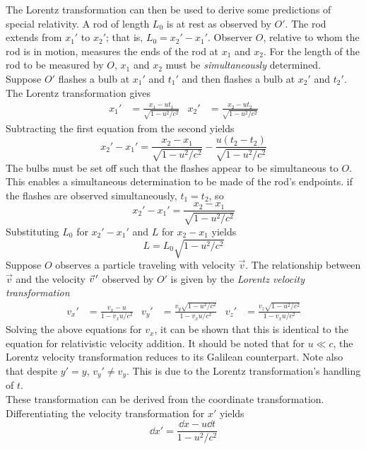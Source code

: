 \documentclass{subfiles}
\begin{document}
		The Lorentz transformation can then be used to derive some predictions of special relativity.
			A rod of length \(L_0\) is at rest as observed by \(O'\). The rod extends from \(x_1'\) to \(x_2'\); that is, \(L_0 = x_2' - x_1'\). Observer \(O\), relative to whom the rod is in motion, measures the ends of the rod at \(x_1\) and \(x_2\). For the length of the rod to be measured by \(O\), \(x_1\) and \(x_2\) must be \textit{simultaneously} determined. \\
			Suppose \(O'\) flashes a bulb at \(x_1'\) and \(t_1'\) and then flashes a bulb at \(x_2'\) and \(t_2'\). The Lorentz transformation gives
				\begin{align*}
					x_1' &= \frac{x_1 - ut_1}{\sqrt{1 - u^2/c^2}} &
						x_2' &= \frac{x_2 - ut_2}{\sqrt{1 - u^2/c^2}}	
				\end{align*}
				Subtracting the first equation from the second yields
				\[x_2' - x_1' = \frac{x_2 - x_1}{\sqrt{1 - u^2/c^2}} - \frac{u(t_2 - t_2)}{\sqrt{1 - u^2/c^2}}\]
				The bulbs must be set off such that the flashes appear to be simultaneous to \(O\). This enables a simultaneous determination to be made of the rod's endpoints. if the flashes are observed simultaneously, \(t_1 = t_2\), so
				\[x_2' - x_1' = \frac{x_2 - x_1}{\sqrt{1 - u^2/c^2}}\]
				Substituting \(L_0\) for \(x_2' - x_1'\) and \(L\) for \(x_2 - x_1\) yields
				\[L = L_0\sqrt{1 - u^2/c^2}\]
			Suppose \(O\) observes a particle traveling with velocity \(\vec{v}\). The relationship between \(\vec{v}\) and the velocity \(\vec{v}\hspace{0.5mm}'\) observed by \(O'\) is given by the \textit{Lorentz velocity transformation}
				\begin{align*}
					v_x' &= \frac{v_x - u}{1 - v_xu/c^2} &
						v_y' &= \frac{v_y\sqrt{1 - u^2/c^2}}{1 - v_xu/c^2} &
						v_z' &= \frac{v_z\sqrt{1 - u^2/c^2}}{1 - v_xu/c^2}
							\tag{Lorentz velocity transformation}	
				\end{align*}
				Solving the above equations for \(v_x\), it can be shown that this is identical to the equation for relativistic velocity addition. It should be noted that for \(u \ll c\), the Lorentz velocity transformation reduces to its Galilean counterpart. Note also that despite \(y' = y\), \(v_y' \ne v_y\). This is due to the Lorentz transformation's handling of \(t\). \\
				These transformation can be derived from the coordinate transformation. 
				Differentiating the velocity transformation for \(x'\) yields
				\[\dd{x'} = \frac{\dd{x} - u\dd{t}}{1 - u^2/c^2}\]
\end{document}
